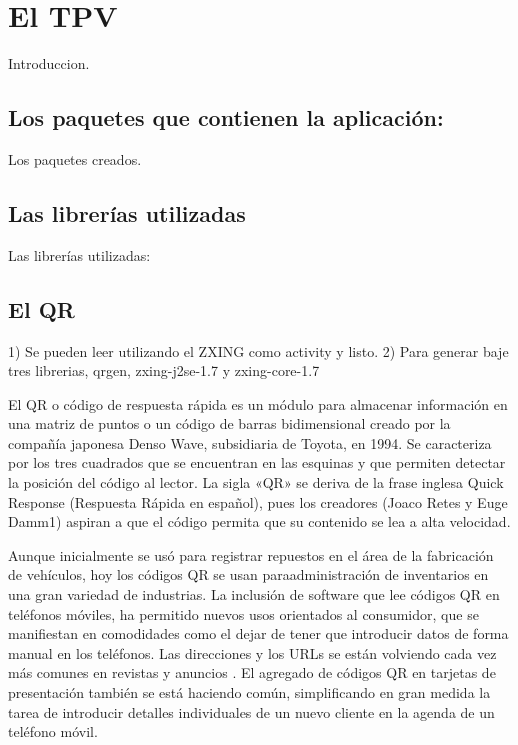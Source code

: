 \chapter{El \acf{TPV}}
\label{cpt:tpv}

Introduccion.

\section{Los paquetes que contienen la aplicaci\'on:}
\label{sec:tpv.packages}

Los paquetes creados.

\section{Las librer\'ias utilizadas}
\label{sec:tpv.libraries}

Las librer\'ias utilizadas:

\section{El \ac{QR}}
\label{sec:tpv.qr}

1) Se pueden leer utilizando el ZXING como activity y listo.
2) Para generar baje tres librerias, qrgen, zxing-j2se-1.7 y zxing-core-1.7

El \ac{QR} o c\'odigo de respuesta rápida es un m\'odulo para almacenar informaci\'on en una matriz de puntos o un c\'odigo de barras bidimensional creado por la compañía japonesa Denso Wave, subsidiaria de Toyota, en 1994. Se caracteriza por los tres cuadrados que se encuentran en las esquinas y que permiten detectar la posici\'on del c\'odigo al lector. La sigla «QR» se deriva de la frase inglesa Quick Response (Respuesta R\'apida en español), pues los creadores (Joaco Retes y Euge Damm1) aspiran a que el c\'odigo permita que su contenido se lea a alta velocidad.


Aunque inicialmente se us\'o para registrar repuestos en el área de la fabricaci\'on de vehículos, hoy los c\'odigos QR se usan paraadministraci\'on de inventarios en una gran variedad de industrias. La inclusi\'on de software que lee c\'odigos QR en teléfonos m\'oviles, ha permitido nuevos usos orientados al consumidor, que se manifiestan en comodidades como el dejar de tener que introducir datos de forma manual en los teléfonos. Las direcciones y los URLs se están volviendo cada vez más comunes en revistas y anuncios . El agregado de c\'odigos QR en tarjetas de presentaci\'on también se está haciendo común, simplificando en gran medida la tarea de introducir detalles individuales de un nuevo cliente en la agenda de un teléfono m\'ovil.

